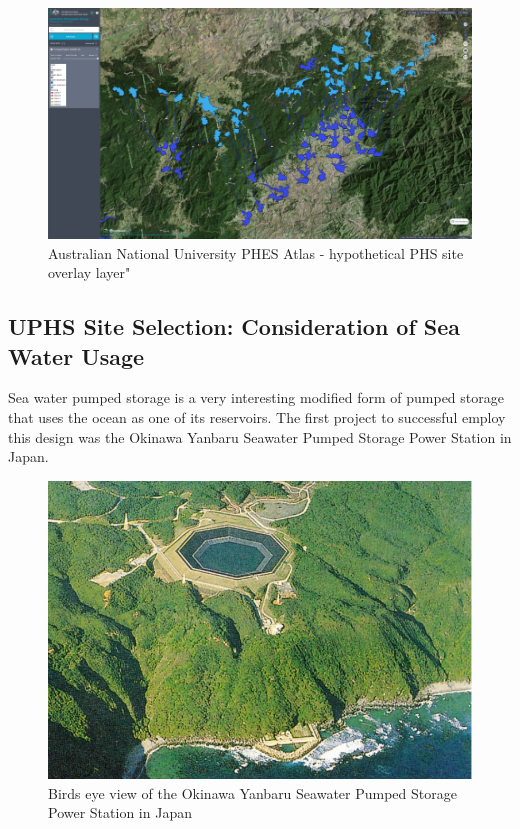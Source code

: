 \documentclass[hidelinks,12pt,a4paper]{article}
\begin{document}
\begin{figure}[ht!]
    \centering
    \includegraphics[width=1\textwidth]{australian-national-university-global-phes-atlas-water-overlay.png}
    \caption{Australian National University PHES Atlas - hypothetical PHS site overlay layer" \cite{AustralianNationalUniversityGlobalPHESAtlas}}
\end{figure}
\FloatBarrier

\subsection{UPHS Site Selection: Consideration of Sea Water Usage}
Sea water pumped storage is a very interesting modified form of pumped storage that uses the ocean as one of its reservoirs. The first project to successful employ this design was the Okinawa Yanbaru Seawater Pumped Storage Power Station in Japan. \cite{SeaWaterPumpedStoragePowerPlant}

\begin{figure}[ht!]
    \centering
    \includegraphics[width=.75\textwidth]{kaprun-hydroelectric-station.png}
    \caption{Birds eye view of the Okinawa Yanbaru Seawater Pumped Storage Power Station in Japan \cite{DevelopmentOfPumpTurbineForSeawaterPumpedStorage}}
\end{figure}
\end{document}
